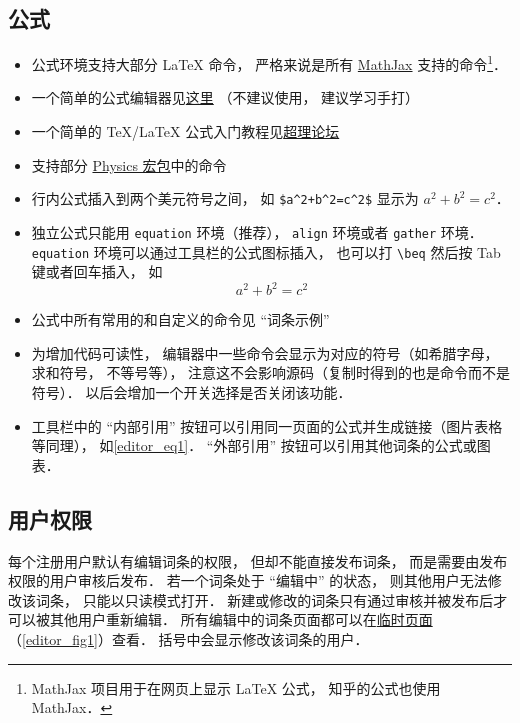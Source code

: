 \subsection{公式}
\begin{itemize}
\item 公式环境支持大部分 LaTeX 命令， 严格来说是所有 \href{https://www.mathjax.org/}{MathJax} 支持的命令\footnote{MathJax 项目用于在网页上显示 LaTeX 公式， 知乎的公式也使用 MathJax．}．
\item 一个简单的公式编辑器见\href{https://www.codecogs.com/latex/eqneditor.php}{这里} （不建议使用， 建议学习手打）
\item 一个简单的 TeX/LaTeX 公式入门教程见\href{https://chaoli.club/index.php/211}{超理论坛}
\item 支持部分 \href{http://mirrors.ibiblio.org/CTAN/macros/latex/contrib/physics/physics.pdf}{Physics 宏包}中的命令
\item 行内公式插入到两个美元符号之间， 如 \lstinline|$a^2+b^2=c^2$| 显示为 $a^2 + b^2 = c^2$．
\item 独立公式只能用 \lstinline|equation| 环境（推荐）， \lstinline|align| 环境或者 \lstinline|gather| 环境． \lstinline|equation| 环境可以通过工具栏的公式图标插入， 也可以打 \lstinline|\beq| 然后按 Tab 键或者回车插入， 如
\begin{equation}\label{editor_eq1}
a^2 + b^2 = c^2
\end{equation}
\item 公式中所有常用的和自定义的命令见 “词条示例”
\item 为增加代码可读性， 编辑器中一些命令会显示为对应的符号（如希腊字母， 求和符号， 不等号等）， 注意这不会影响源码（复制时得到的也是命令而不是符号）． 以后会增加一个开关选择是否关闭该功能．
\item 工具栏中的 “内部引用” 按钮可以引用同一页面的公式并生成链接（图片表格等同理）， 如\autoref{editor_eq1}． “外部引用” 按钮可以引用其他词条的公式或图表．
\end{itemize}

\subsection{用户权限}
每个注册用户默认有编辑词条的权限， 但却不能直接发布词条， 而是需要由发布权限的用户审核后发布． 若一个词条处于 “编辑中” 的状态， 则其他用户无法修改该词条， 只能以只读模式打开． 新建或修改的词条只有通过审核并被发布后才可以被其他用户重新编辑． 所有编辑中的词条页面都可以在\href{http://wuli.wiki/changed/changed.html}{临时页面}（\autoref{editor_fig1}）查看． 括号中会显示修改该词条的用户．

